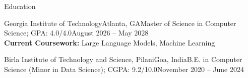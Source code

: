 \begin{rSection}{Education}
    \begin{rSubsectionPlain}{Georgia Institute of Technology}{Atlanta, GA}{Master of Science in Computer Science; GPA: 4.0/4.0}{August 2026 -- May 2028}
        \\ \textbf{Current Coursework:} Large Language Models, Machine Learning
    \end{rSubsectionPlain}
    \begin{rSubsectionPlain}{Birla Institute of Technology and Science, Pilani}{Goa, India}{B.E. in Computer Science (Minor in Data Science); CGPA: 9.2/10.0}{November 2020 -- June 2024}
    \end{rSubsectionPlain}
\end{rSection}
